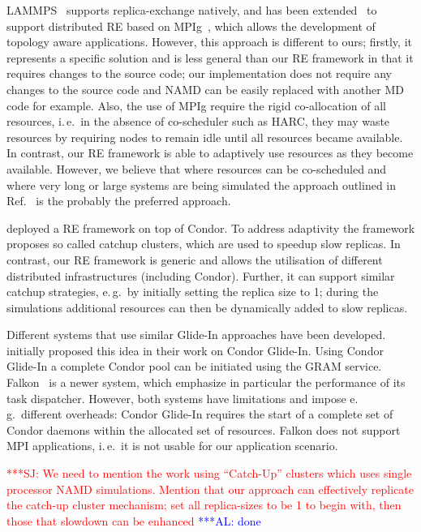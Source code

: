 \documentclass{rspublic}
\newcommand{\alnote}[1]{ {\textcolor{blue} { ***AL: #1 }}}
\newcommand{\jhanote}[1]{ {\textcolor{red} { ***SJ: #1 }}}
\newcommand{\alnote}[1]{}
\newcommand{\jhanote}[1]{}
\newcommand{\glidein}[1]{Glide-In }
\begin{document}
LAMMPS~\citep{Plimpton:1995nx,repex_mpig} supports replica-exchange
natively, and has been extended~\cite{repex_mpig} to support
distributed RE based on MPIg~\citep{Toonen:2008ao}, which allows the
development of topology aware applications. However, this approach is
different to ours; firstly, it represents a specific solution and is
less general than our RE framework in that it requires changes to the
source code; our implementation does not require any changes to the
source code and NAMD can be easily replaced with another MD code for
example.  Also, the use of MPIg require the rigid co-allocation of all
resources, i.\,e.\ in the absence of co-scheduler such as HARC, they
may waste resources by requiring nodes to remain idle until all
resources became available.  In contrast, our RE framework is able to
adaptively use resources as they become available. However, we believe
that where resources can be co-scheduled and where very long or large
systems are being simulated the approach outlined in
Ref.~\citep{repex_mpig} is the probably the preferred approach.

\cite{Woods:2005nx} deployed a RE framework on top of Condor.  To
address adaptivity the framework proposes so called catchup clusters,
which are used to speedup slow replicas. In contrast, our RE framework
is generic and allows the utilisation of different distributed
infrastructures (including Condor). Further, it can support similar
catchup strategies, e.\,g.\ by initially setting the replica size to
1; during the simulations additional resources can then be dynamically
added to slow replicas.

Different systems that use similar Glide-In approaches have been
developed. \citet{citeulike:291860} initially proposed this idea in
their work on Condor Glide-In. Using Condor Glide-In a complete Condor
pool can be initiated using the GRAM service. Falkon~\citep{1362680}
is a newer system, which emphasize in particular the performance of
its task dispatcher.  However, both systems have limitations and
impose e.\,g.\ different overheads: Condor \glidein\ requires the
start of a complete set of Condor daemons within the allocated set of
resources. 
Falkon  does not support MPI applications, i.\,e.\ it is not usable for our
application scenario.  

\jhanote{We need to mention the work using ``Catch-Up'' clusters which
  uses single processor NAMD simulations. Mention that our approach
  can effectively replicate the catch-up cluster mechanism; set all
  replica-sizes to be 1 to begin with, then those that slowdown can
  be enhanced}
\alnote{done}
\end{document}
